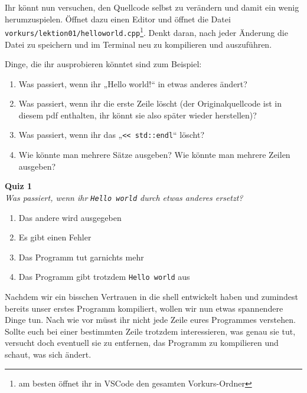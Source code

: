 \newpage

\begin{spiel}

Ihr könnt nun versuchen, den Quellcode selbst zu verändern und damit ein wenig
herumzuspielen. Öffnet dazu einen Editor und öffnet die Datei
\texttt{vorkurs/lektion01/helloworld.cpp}\footnote{am besten öffnet ihr in VSCode den gesamten Vorkurs-Ordner}. Denkt daran, nach jeder Änderung die Datei zu speichern und
im Terminal neu zu kompilieren und auszuführen.

Dinge, die ihr ausprobieren könntet sind zum Beispiel:
\begin{enumerate}
    \item Was passiert, wenn ihr „Hello world!“ in etwas anderes ändert?
    \item Was passiert, wenn ihr die erste Zeile löscht (der Originalquellcode
        ist in diesem pdf enthalten, ihr könnt sie also später wieder
        herstellen)?
    \item Was passiert, wenn ihr das „\verb|<< std::endl|“ löscht?
    \item Wie könnte man mehrere Sätze ausgeben? Wie könnte man mehrere Zeilen
        ausgeben?
\end{enumerate}
\end{spiel}

\textbf{Quiz 1}\\
\textit{Was passiert, wenn ihr \texttt{Hello world} durch etwas anderes ersetzt?}
\begin{enumerate}[label=\alph*)]
    \item Das andere wird ausgegeben
    \item Es gibt einen Fehler
    \item Das Programm tut garnichts mehr
    \item Das Programm gibt trotzdem \texttt{Hello world} aus
\end{enumerate}


Nachdem wir ein bisschen Vertrauen in die shell entwickelt haben und zumindest
bereits unser erstes Programm kompiliert, wollen wir nun etwas spannendere
Dinge tun. Nach wie vor müsst ihr nicht jede Zeile eures Programmes verstehen.
Sollte euch bei einer bestimmten Zeile trotzdem interessieren, was genau sie
tut, versucht doch eventuell sie zu entfernen, das Programm zu kompilieren und
schaut, was sich ändert.

